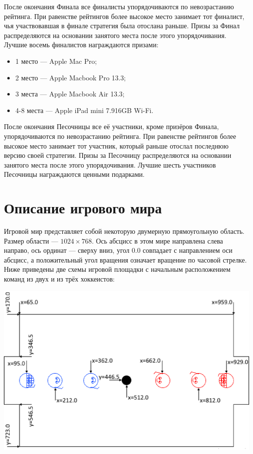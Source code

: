 После окончания Финала все финалисты упорядочиваются по невозрастанию рейтинга. При равенстве рейтингов более высокое место занимает тот
финалист, чья участвовавшая в финале стратегия была отослана раньше. Призы за Финал распределяются на основании занятого места после этого
упорядочивания. Лучшие восемь финалистов награждаются призами:
\begin{itemize}
\item 1 место --- Apple Mac Pro;
\item 2 место --- Apple Macbook Pro 13.3\textquotedbl;
\item 3 места --- Apple Macbook Air 13.3\textquotedbl;
\item 4-8 места --- Apple iPad mini 7.9\textquotedbl 16GB Wi-Fi.
\end{itemize}

После окончания Песочницы все её участники, кроме призёров Финала, упорядочиваются по невозрастанию рейтинга. При равенстве рейтингов более
высокое место занимает тот участник, который раньше отослал последнюю версию своей стратегии. Призы за Песочницу распределяются на основании
занятого места после этого упорядочивания. Лучшие шесть участников Песочницы награждаются ценными подарками.

\section{Описание игрового мира}

Игровой мир представляет собой некоторую двумерную прямоугольную область. Размер области --- $1024\times768$. Ось абсцисс в этом мире
направлена слева направо, ось ординат --- сверху вниз, угол $0.0$ совпадает с направлением оси абсцисс, а положительный угол вращения
означает вращение по часовой стрелке. Ниже приведены две схемы игровой площадки с начальным расположением команд из двух и из трёх
хоккеистов:

\includegraphics{images/FieldScheme-2vs2.eps}


